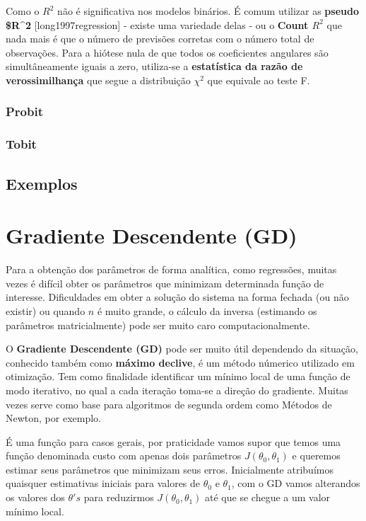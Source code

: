 \documentclass[
]{book}
\begin{document}
Como o \(R^2\) não é significativa nos modelos binários. É comum utilizar as \textbf{pseudo \$R\^{}2} {[}long1997regression{]} - existe uma variedade delas - ou o \textbf{Count \(R^2\)} que nada mais é que o número de previsões corretas com o número total de observações. Para a hiótese nula de que todos os coeficientes angulares são simultâneamente iguais a zero, utiliza-se a \textbf{estatística da razão de verossimilhança} que segue a distribuição \(\chi^2\) que equivale ao teste F.

\hypertarget{probit}{%
\subsubsection{Probit}\label{probit}}

\hypertarget{tobit}{%
\subsubsection{Tobit}\label{tobit}}

\hypertarget{exemplo1reg}{%
\subsection{Exemplos}\label{exemplo1reg}}

\hypertarget{GD}{%
\section{Gradiente Descendente (GD)}\label{GD}}

Para a obtenção dos parâmetros de forma analítica, como regressões, muitas vezes é difícil obter os parâmetros que minimizam determinada função de interesse. Dificuldades em obter a solução do sistema na forma fechada (ou não existir) ou quando \(n\) é muito grande, o cálculo da inversa (estimando os parâmetros matricialmente) pode ser muito caro computacionalmente.

O \textbf{Gradiente Descendente (GD)} pode ser muito útil dependendo da situação, conhecido também como \textbf{máximo declive}, é um método númerico utilizado em otimização. Tem como finalidade identificar um mínimo local de uma função de modo iterativo, no qual a cada iteração toma-se a direção do gradiente. Muitas vezes serve como base para algoritmos de segunda ordem como Métodos de Newton, por exemplo.

É uma função para casos gerais, por praticidade vamos supor que temos uma função denominada custo com apenas dois parâmetros \(J(\theta_0,\theta_1)\) e queremos estimar seus parâmetros que minimizam seus erros. Inicialmente atribuímos quaisquer estimativas iniciais para valores de \(\theta_0\) e \(\theta_1\), com o GD vamos alterandos os valores dos \(\theta's\) para reduzirmos \(J(\theta_0,\theta_1)\) até que se chegue a um valor mínimo local.
\end{document}
